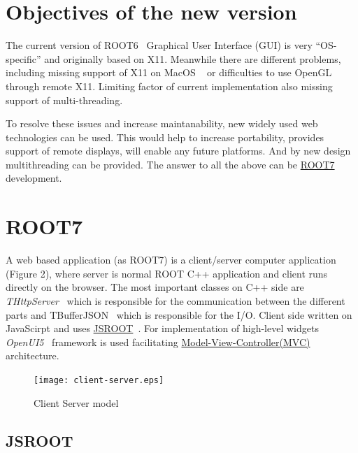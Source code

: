 \documentclass[a4paper]{jpconf}
\begin{document}
\section{Objectives of the new version}

The current version of ROOT6~\cite{root6} Graphical User Interface (GUI) is very ``OS-specific'' and originally based on X11.
Meanwhile there are different problems, including missing support of X11 on MacOS ~\cite{x11} or difficulties to use OpenGL through remote X11.
Limiting factor of current implementation also missing support of multi-threading. 

To resolve these issues and increase maintanability, new widely used web technologies can be used. This would help to increase portability, 
provides support of remote displays, will enable any future platforms. And by new design multithreading can be provided.
The answer to all the above can be \href{https://root.cern.ch/root-7}{ROOT7}~\cite{root7} development.

\section{ROOT7}

A web based application (as ROOT7) is a client/server computer application (Figure 2),
where server is normal ROOT C++ application and client runs directly on the browser.
The most important classes on C++ side are {\it THttpServer}~\cite{http} which is responsible
for the communication between the different parts and TBufferJSON~\cite{buffer}
which is responsible for the I/O. Client side written on JavaScirpt and uses \href{https://root.cern/js/}{JSROOT}~\cite{jsroot}. 
For implementation of high-level widgets \textit{OpenUI5}~\cite{openui} framework is used facilitating
\href{https://en.wikipedia.org/wiki/Model%E2%80%93view%E2%80%93controller}{Model-View-Controller(MVC)}~\cite{mvc}
architecture. 

\begin{figure}[h]
  \begin{center}
    \texttt{[image: client-server.eps]}\hspace{2pc}%
  \end{center}
  \centering
\begin{minipage}[b]{20pc}\caption{\label{label}Client Server model}
\end{minipage}
\end{figure}

\subsection{JSROOT}
\end{document}
